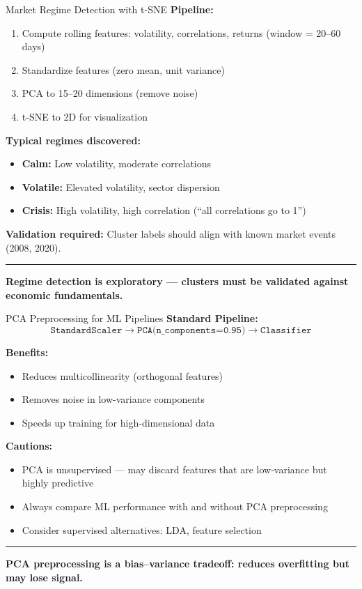 \documentclass[8pt,aspectratio=169]{beamer}
\newcommand{\bottomnote}[1]{%
\vfill
\vspace{-2mm}
\textcolor{mllavender2}{\rule{\textwidth}{0.4pt}}
\vspace{1mm}
\footnotesize
\textbf{#1}
}
\newcommand{\highlight}[1]{\textcolor{mlorange}{\textbf{#1}}}
\begin{document}
\begin{frame}[t]{Market Regime Detection with t-SNE}
\textbf{Pipeline:}
\begin{enumerate}
  \item Compute rolling features: volatility, correlations, returns (window = 20--60 days)
  \item Standardize features (zero mean, unit variance)
  \item PCA to 15--20 dimensions (remove noise)
  \item t-SNE to 2D for visualization
\end{enumerate}

\vspace{0.3em}
\textbf{Typical regimes discovered:}
\begin{itemize}
  \item \textcolor{mlgreen}{\textbf{Calm:}} Low volatility, moderate correlations
  \item \textcolor{mlorange}{\textbf{Volatile:}} Elevated volatility, sector dispersion
  \item \textcolor{mlred}{\textbf{Crisis:}} High volatility, high correlation (``all correlations go to 1'')
\end{itemize}

\vspace{0.3em}
\highlight{Validation required:} Cluster labels should align with known market events (2008, 2020).
\bottomnote{Regime detection is exploratory --- clusters must be validated against economic fundamentals.}
\end{frame}

\begin{frame}[t]{PCA Preprocessing for ML Pipelines}
\textbf{Standard Pipeline:}
\[
\texttt{StandardScaler} \rightarrow \texttt{PCA(n\_components=0.95)} \rightarrow \texttt{Classifier}
\]

\vspace{0.3em}
\textbf{Benefits:}
\begin{itemize}
  \item Reduces multicollinearity (orthogonal features)
  \item Removes noise in low-variance components
  \item Speeds up training for high-dimensional data
\end{itemize}

\vspace{0.3em}
\textbf{Cautions:}
\begin{itemize}
  \item PCA is unsupervised --- may discard features that are low-variance but highly predictive
  \item Always compare ML performance with and without PCA preprocessing
  \item Consider supervised alternatives: LDA, feature selection
\end{itemize}
\bottomnote{PCA preprocessing is a bias--variance tradeoff: reduces overfitting but may lose signal.}
\end{frame}
\end{document}

